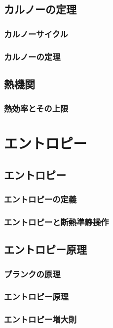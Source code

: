 \documentclass[a4paper]{jsreport}
\begin{document}
        \section{カルノーの定理}
            \subsection*{カルノーサイクル}


            \subsection*{カルノーの定理}


        \section{熱機関}    
            \subsection*{熱効率とその上限}
    
    \chapter{エントロピー}
        \section{エントロピー}
            \subsection*{エントロピーの定義}
                
            \subsection*{エントロピーと断熱準静操作}
        \section{エントロピー原理}
            \subsection*{プランクの原理}
            \subsection*{エントロピー原理}
            \subsection*{エントロピー増大則}
\end{document}
